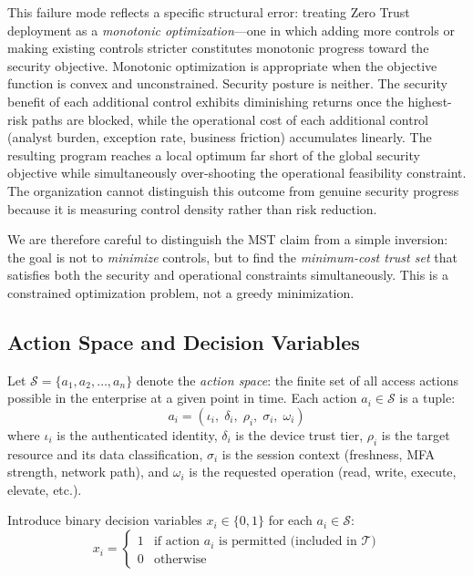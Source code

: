 \documentclass[acmlarge]{acmart}
\begin{document}
This failure mode reflects a specific structural error: treating Zero Trust deployment
as a \textit{monotonic optimization}---one in which adding more controls or making
existing controls stricter constitutes monotonic progress toward the security objective.
Monotonic optimization is appropriate when the objective function is convex and
unconstrained. Security posture is neither. The security benefit of each additional
control exhibits diminishing returns once the highest-risk paths are blocked, while
the operational cost of each additional control (analyst burden, exception rate,
business friction) accumulates linearly. The resulting program reaches a local
optimum far short of the global security objective while simultaneously
over-shooting the operational feasibility constraint. The organization cannot
distinguish this outcome from genuine security progress because it is measuring
control density rather than risk reduction.

We are therefore careful to distinguish the MST claim from a simple inversion: the
goal is not to \textit{minimize} controls, but to find the \textit{minimum-cost
trust set} that satisfies both the security and operational constraints simultaneously.
This is a constrained optimization problem, not a greedy minimization.

\subsection{Action Space and Decision Variables}
\label{sec:theory_action}

Let $\mathcal{S} = \{a_1, a_2, \ldots, a_n\}$ denote the \textit{action space}: the
finite set of all access actions possible in the enterprise at a given point in time.
Each action $a_i \in \mathcal{S}$ is a tuple:
\begin{equation}
a_i = (\iota_i,\; \delta_i,\; \rho_i,\; \sigma_i,\; \omega_i)
\label{eq:action_tuple}
\end{equation}
where $\iota_i$ is the authenticated identity, $\delta_i$ is the device trust tier,
$\rho_i$ is the target resource and its data classification, $\sigma_i$ is the
session context (freshness, MFA strength, network path), and $\omega_i$ is the
requested operation (read, write, execute, elevate, etc.).

Introduce binary decision variables $x_i \in \{0,1\}$ for each $a_i \in \mathcal{S}$:
\begin{equation}
x_i = \begin{cases} 1 & \text{if action } a_i \text{ is permitted (included in } \mathcal{T}) \\ 0 & \text{otherwise} \end{cases}
\label{eq:decision_var}
\end{equation}
\end{document}
